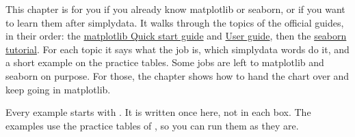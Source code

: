 

This chapter is for you if you already know matplotlib or seaborn, or if you want to learn them after
simplydata. It walks through the topics of the official guides, in their order: the
\href{https://matplotlib.org/stable/users/explain/quick_start.html}{matplotlib Quick start guide} and
\href{https://matplotlib.org/stable/users/index.html}{User guide}, then the
\href{https://seaborn.pydata.org/tutorial.html}{seaborn tutorial}. For each topic it says what the job
is, which simplydata words do it, and a short example on the practice tables. Some jobs are left to
matplotlib and seaborn on purpose. For those, the chapter shows how to hand the chart over and keep
going in matplotlib.

Every example starts with . It is written once here, not in each
box. The examples use the practice tables of , so you can run them as they
are.


